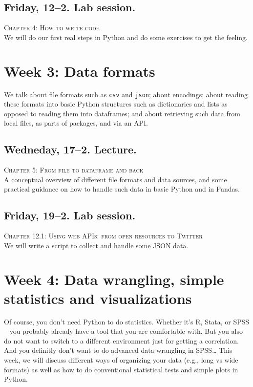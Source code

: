 \subsection*{Friday, 12--2. Lab session.}
\textsc{ Chapter 4: How to write code}\\
We will do our first real steps in Python and do some exercises to get the feeling.


\section*{Week 3: Data formats}
We talk about file formats such as \texttt{csv} and \texttt{json}; about encodings; about reading these formats into basic Python structures such as dictionaries and lists as opposed to reading them into dataframes; and about retrieving such data from local files, as parts of packages, and via an API.

\subsection*{Wedneday, 17--2. Lecture.}
\textsc{ Chapter 5: From file to dataframe and back}\\
A conceptual overview of different file formats and data sources, and some practical guidance on how to handle such data in basic Python and in Pandas.


\subsection*{Friday, 19--2. Lab session.}
\textsc{ Chapter 12.1: Using web APIs: from open resources to Twitter}\\
We will write a script to collect and handle some JSON data.



\section*{Week 4: Data wrangling, simple statistics and visualizations}
Of course, you don't need Python to do statistics. Whether it's R, Stata, or SPSS -- you probably already have a tool that you are comfortable with. But you also do not want to switch to a different environment just for getting a correlation. And you definitly don't want to do advanced data wrangling in SPSS\ldots
This week, we will discuss different ways of organizing your data (e.g., long vs wide formats) as well as how to do conventional statistical tests and simple plots in Python.

